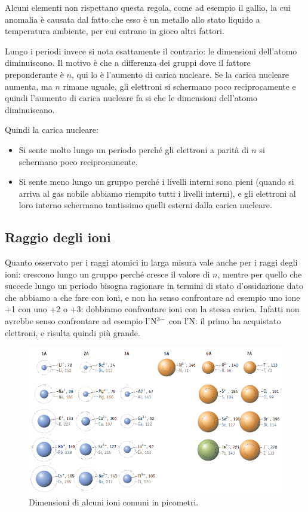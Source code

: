 Alcuni elementi non rispettano questa regola, come ad esempio il gallio, la cui anomalia è causata dal fatto che esso è un metallo allo stato liquido a temperatura ambiente, per cui entrano in gioco altri fattori.

Lungo i periodi invece si nota esattamente il contrario: le dimensioni dell'atomo diminuiscono. Il motivo è che a differenza dei gruppi dove il fattore preponderante è $n$, qui lo è l'aumento di carica nucleare. Se la carica nucleare aumenta, ma $n$ rimane uguale, gli elettroni si schermano poco reciprocamente e quindi l'aumento di carica nucleare fa si che le dimensioni dell'atomo diminuiscano.

Quindi la carica nucleare:
\begin{itemize}
    \item Si sente molto lungo un periodo perché gli elettroni a parità di $n$ si schermano poco reciprocamente.
    \item Si sente meno lungo un gruppo perché i livelli interni sono pieni (quando si arriva al gas nobile abbiamo riempito tutti i livelli interni), e gli elettroni al loro interno schermano tantissimo quelli esterni dalla carica nucleare.
\end{itemize}
\subsection{Raggio degli ioni}
Quanto osservato per i raggi atomici in larga misura vale anche per i raggi degli ioni: crescono lungo un gruppo perché cresce il valore di $n$, mentre per quello che succede lungo un periodo bisogna ragionare in termini di stato d'ossidazione dato che abbiamo a che fare con ioni, e non ha senso confrontare ad esempio uno ione +1 con uno +2 o +3: dobbiamo confrontare ioni con la stessa carica. Infatti non avrebbe senso confrontare ad esempio l'$\rm N^{3-}$ con l'N: il primo ha acquistato elettroni, e risulta quindi più grande.

\begin{figure}[H]
    \centering
    \includegraphics[width=13cm]{immagini/raggi-ionici.png}
    \caption*{Dimensioni di alcuni ioni comuni in picometri.}
\end{figure}

